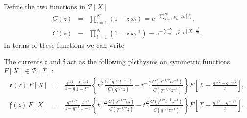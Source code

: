 Define the two functions in ${\mathcal P}[X]$
\begin{eqnarray}
C(z)&=&\prod_{i=1}^{N}(1-z \,x_i)= e^{-\sum_{k=1}^\infty p_k[X] \frac{z^k}{k} }\label{Cdef} ,\\
{\widetilde C}(z)&=&\prod_{i=1}^{N}(1-z \,x_i^{-1})=e^{-\sum_{k=1}^\infty p_{-k}[X] \frac{z^k}{k} }\label{Ctdef}.
\end{eqnarray}
In terms of these functions we can write
\begin{thm}\label{pletbo}
The currents ${\mathfrak e}$ and ${\mathfrak f}$ act as the following plethysms on symmetric functions $F[X]\in {\mathcal P}[X]$:
\begin{eqnarray*}
{\mathfrak e}(z)\, F[X] &=&\frac{q^{1/2}}{1-q} \frac{t^{-1/2}}{1-t^{-1}}\left\{ t^{\frac{N}{2}}\frac{C(q^{1/2}t^{-1}z)}{C(q^{1/2}z)}-t^{-\frac{N}{2}}\frac{{\widetilde C}(q^{-1/2}tz^{-1})}{{\widetilde C}(q^{-1/2}z^{-1})}\right\}
F\left[ X+\frac{q^{1/2}-q^{-1/2}}{z}\right],\\
{\mathfrak f}(z)\, F[X] &=&\frac{q^{-1/2}}{1-q^{-1}} \frac{t^{1/2}}{1-t}\left\{t^{-\frac{N}{2}}\frac{C(q^{-1/2}tz)}{C(q^{-1/2}z)}- t^{\frac{N}{2}}\frac{{\widetilde C}(q^{1/2}t^{-1}z^{-1})}{{\widetilde C}(q^{1/2}z^{-1})}\right\}
F\left[ X-\frac{q^{1/2}-q^{-1/2}}{z}\right].
\end{eqnarray*}
\end{thm}
